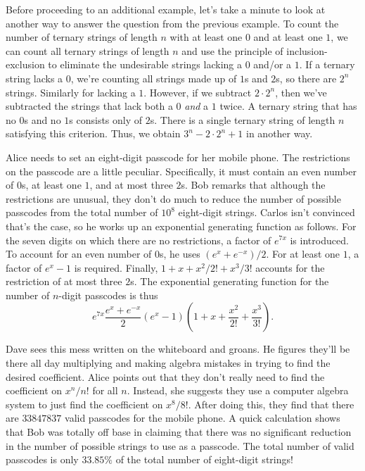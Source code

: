 Before proceeding to an additional example, let's take a minute to
look at another way to answer the question from the previous
example. To count the number of ternary strings of length $n$ with at
least one $0$ and at least one $1$, we can count all ternary strings
of length $n$ and use the principle of inclusion-exclusion to
eliminate the undesirable strings lacking a $0$ and/or a $1$. If a
ternary string lacks a $0$, we're counting all strings made up of $1$s
and $2$s, so there are $2^n$ strings. Similarly for lacking a
$1$. However, if we subtract $2\cdot 2^n$, then we've subtracted the
strings that lack both a $0$ \emph{and} a $1$ twice. A ternary string
that has no $0$s and no $1$s consists only of $2$s. There is a single
ternary string of length $n$ satisfying this criterion. Thus, we
obtain $3^n-2\cdot 2^n+1$ in another way.

\begin{example}
  Alice needs to set an eight-digit passcode for her mobile phone. The
  restrictions on the passcode are a little peculiar. Specifically, it
  must contain an even number of $0$s, at least one $1$, and at most
  three $2$s. Bob remarks that although the restrictions are unusual,
  they don't do much to reduce the number of possible passcodes from
  the total number of $10^8$ eight-digit strings. Carlos isn't
  convinced that's the case, so he works up an exponential generating
  function as follows. For the seven digits on which there are no
  restrictions, a factor of $e^{7x}$ is introduced. To account for an
  even number of $0$s, he uses $(e^x+e^{-x})/2$. For at least one
  $1$, a factor of $e^x-1$ is required. Finally, $1+x+x^2/2!+x^3/3!$
  accounts for the restriction of at most three $2$s. The exponential
  generating function for the number of $n$-digit passcodes is thus
  \[e^{7x}\frac{e^x+e^{-x}}{2}(e^x-1)\left(1+x+\frac{x^2}{2!} +
    \frac{x^3}{3!}\right).\]
  
  Dave sees this mess written on the whiteboard and groans. He figures
  they'll be there all day multiplying and making algebra mistakes in
  trying to find the desired coefficient. Alice points out that they
  don't really need to find the coefficient on $x^n/n!$ for all
  $n$. Instead, she suggests they use a computer algebra system to
  just find the coefficient on $x^8/8!$. After doing this, they find
  that there are $33847837$ valid passcodes for the mobile phone. A
  quick calculation shows that Bob was totally off base in claiming
  that there was no significant reduction in the number of possible
  strings to use as a passcode. The total number of valid passcodes is
  only $33.85\%$ of the total number of eight-digit strings!
\end{example}

